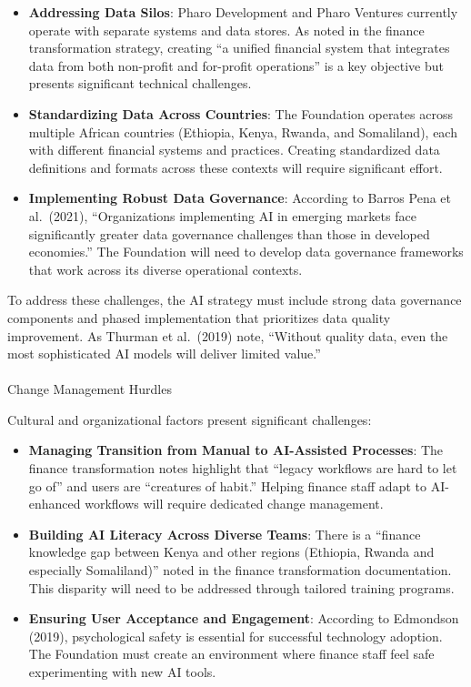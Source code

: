 \documentclass[
]{article}
\makeatletter
\let\oldparagraph\paragraph
\renewcommand{\paragraph}{
    \@ifstar
      \xxxParagraphStar
      \xxxParagraphNoStar
  }
\newcommand{\xxxParagraphStar}[1]{\oldparagraph*{#1}\mbox{}}
\newcommand{\xxxParagraphNoStar}[1]{\oldparagraph{#1}\mbox{}}
\makeatother
\begin{document}
\begin{itemize}
\item
  \textbf{Addressing Data Silos}: Pharo Development and Pharo Ventures
  currently operate with separate systems and data stores. As noted in
  the finance transformation strategy, creating ``a unified financial
  system that integrates data from both non-profit and for-profit
  operations'' is a key objective but presents significant technical
  challenges.
\item
  \textbf{Standardizing Data Across Countries}: The Foundation operates
  across multiple African countries (Ethiopia, Kenya, Rwanda, and
  Somaliland), each with different financial systems and practices.
  Creating standardized data definitions and formats across these
  contexts will require significant effort.
\item
  \textbf{Implementing Robust Data Governance}: According to Barros Pena
  et al.~(2021), ``Organizations implementing AI in emerging markets
  face significantly greater data governance challenges than those in
  developed economies.'' The Foundation will need to develop data
  governance frameworks that work across its diverse operational
  contexts.
\end{itemize}

To address these challenges, the AI strategy must include strong data
governance components and phased implementation that prioritizes data
quality improvement. As Thurman et al.~(2019) note, ``Without quality
data, even the most sophisticated AI models will deliver limited
value.''

\paragraph{Change Management Hurdles}\label{change-management-hurdles}

Cultural and organizational factors present significant challenges:

\begin{itemize}
\item
  \textbf{Managing Transition from Manual to AI-Assisted Processes}: The
  finance transformation notes highlight that ``legacy workflows are
  hard to let go of'' and users are ``creatures of habit.'' Helping
  finance staff adapt to AI-enhanced workflows will require dedicated
  change management.
\item
  \textbf{Building AI Literacy Across Diverse Teams}: There is a
  ``finance knowledge gap between Kenya and other regions (Ethiopia,
  Rwanda and especially Somaliland)'' noted in the finance
  transformation documentation. This disparity will need to be addressed
  through tailored training programs.
\item
  \textbf{Ensuring User Acceptance and Engagement}: According to
  Edmondson (2019), psychological safety is essential for successful
  technology adoption. The Foundation must create an environment where
  finance staff feel safe experimenting with new AI tools.
\end{itemize}
\end{document}

